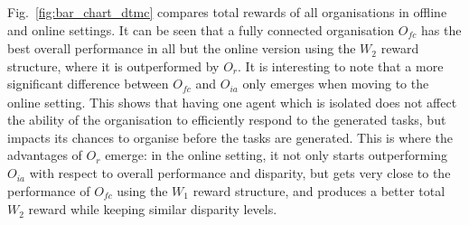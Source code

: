 \documentclass{llncs}
\begin{document}
Fig.~\ref{fig:bar_chart_dtmc} compares total rewards of all organisations in offline and online settings. It can be seen that a fully connected organisation $O_{\mathit{fc}}$ has the best overall performance in all but the online version using the $W_2$ reward structure, where it is outperformed by $O_r$. It is interesting to note that a more significant difference between $O_{\mathit{fc}}$ and $O_{ia}$ only emerges when moving to the online setting. This shows that having one agent which is isolated does not affect the ability of the organisation to efficiently respond to the generated tasks, but impacts its chances to organise before the tasks are generated. This is where the advantages of $O_r$ emerge: in the online setting, it not only starts outperforming $O_{ia}$ with respect to overall performance and disparity, but gets very close to the performance of $O_{\mathit{fc}}$ using the $W_1$ reward structure, and produces a better total $W_2$ reward while keeping similar disparity levels.
\end{document}
